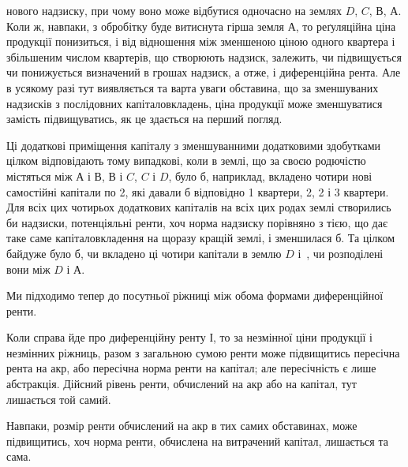 \parcont{}  %
нового надзиску, при чому воно може відбутися одночасно на землях $D$, $C$, $В$, $А$.
Коли ж, навпаки, з обробітку буде витиснута гірша земля $А$, то реґуляційна
ціна продукції понизиться, і від відношення між зменшеною ціною одного
квартера і збільшеним числом квартерів, що створюють надзиск, залежить, чи
підвищується чи понижується визначений в грошах надзиск, а отже, і диференційна
рента. Але в усякому разі тут виявляється та варта уваги обставина,
що за зменшуваних надзисків з послідовних капіталовкладень, ціна продукції
може зменшуватися замість підвищуватись, як це здається на перший погляд.

Ці додаткові приміщення капіталу з зменшуванними додатковими здобутками
цілком відповідають тому випадкові, коли в землі, що за своєю родючістю
містяться між $А$ і $В$, $В$ і $C$, $C$ і $D$, було б, наприклад, вкладено чотири нові
самостійні капітали по 2, які давали б відповідно 1 квартери,
2, 2 і 3 квартери. Для всіх цих чотирьох додаткових капіталів на всіх
цих родах землі створились би надзиски, потенціяльні ренти, хоч норма надзиску
порівняно з тією, що дає таке саме капіталовкладення на щоразу кращій землі,
і зменшилася б. Та цілком байдуже було б, чи вкладено ці чотири капітали
в землю $D$ і~, чи розподілені вони між $D$ і $А$.

Ми підходимо тепер до посутньої ріжниці між обома формами диференційної
ренти.

Коли справа йде про диференційну ренту І, то за незмінної ціни продукції
і незмінних ріжниць, разом з загальною сумою ренти може підвищитись
пересічна рента на акр, або пересічна норма ренти на капітал; але пересічність
є лише абстракція. Дійсний рівень ренти, обчислений на акр або на капітал,
тут лишається той самий.

Навпаки, розмір ренти обчислений на акр в тих самих обставинах, може
підвищитись, хоч норма ренти, обчислена на витрачений капітал, лишається
та сама.

